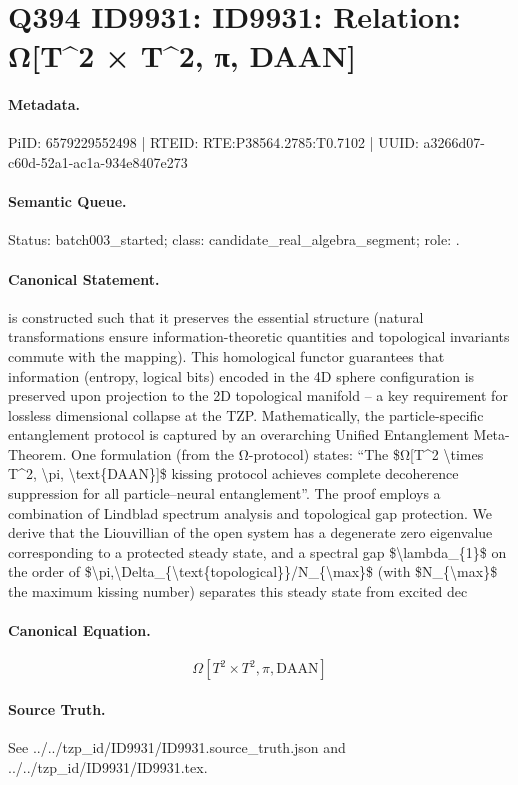 \section*{Q394 ID9931: ID9931: Relation: Ω[T\textasciicircum{}2 × T\textasciicircum{}2, π, DAAN]}
\paragraph{Metadata.}
PiID: 6579229552498 | RTEID: RTE:P38564.2785:T0.7102 | UUID: a3266d07-c60d-52a1-ac1a-934e8407e273

\paragraph{Semantic Queue.}
Status: batch003\_started; class: candidate\_real\_algebra\_segment; role: .

\paragraph{Canonical Statement.}
is constructed such that it preserves the essential structure (natural transformations ensure information-theoretic quantities and topological invariants commute with the mapping). This homological functor guarantees that information (entropy, logical bits) encoded in the 4D sphere configuration is preserved upon projection to the 2D topological manifold – a key requirement for lossless dimensional collapse at the TZP. Mathematically, the particle-specific entanglement protocol is captured by an overarching Unified Entanglement Meta-Theorem. One formulation (from the Ω-protocol) states: “The \$Ω[T\textasciicircum{}2 \textbackslash{}times T\textasciicircum{}2, \textbackslash{}pi, \textbackslash{}text\{DAAN\}]\$ kissing protocol achieves complete decoherence suppression for all particle–neural entanglement”. The proof employs a combination of Lindblad spectrum analysis and topological gap protection. We derive that the Liouvillian of the open system has a degenerate zero eigenvalue corresponding to a protected steady state, and a spectral gap \$\textbackslash{}lambda\_\{1\}\$ on the order of \$\textbackslash{}pi,\textbackslash{}Delta\_\{\textbackslash{}text\{topological\}\}/N\_\{\textbackslash{}max\}\$ (with \$N\_\{\textbackslash{}max\}\$ the maximum kissing number) separates this steady state from excited dec

\paragraph{Canonical Equation.}
\[
Ω[T^2 \times T^2, \pi, \text{DAAN}]
\]

\paragraph{Source Truth.}
See ../../tzp\_id/ID9931/ID9931.source\_truth.json and ../../tzp\_id/ID9931/ID9931.tex.
